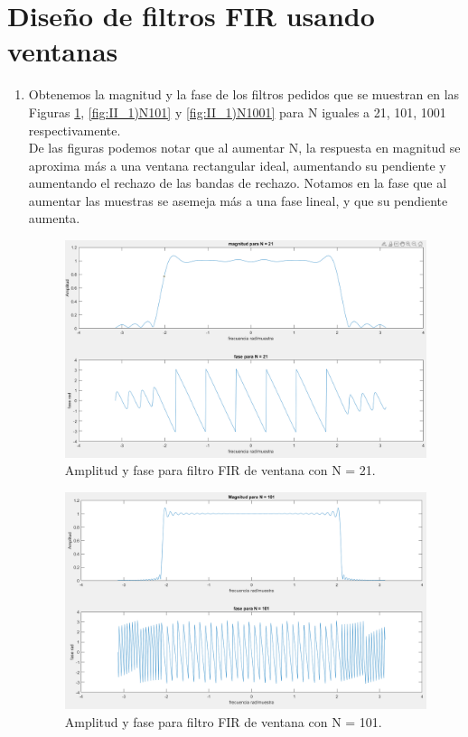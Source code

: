 \documentclass[letterpaper,onecolumn,10pt,journal,final]{IEEEtran}
\begin{document}
\section{Diseño de filtros FIR usando ventanas}
\begin{enumerate}[1)]
    \item %
    Obtenemos la magnitud y la fase de los filtros pedidos que se muestran en las Figuras \ref{fig:II_1)N21}, \ref{fig:II_1)N101} y \ref{fig:II_1)N1001} para N iguales a 21, 101, 1001 respectivamente.\\
    De las figuras podemos notar que al aumentar N, la respuesta en magnitud se aproxima más a una ventana rectangular ideal, aumentando su pendiente y aumentando el rechazo de las bandas de rechazo. Notamos en la fase que al aumentar las muestras se asemeja más a una fase lineal, y que su pendiente aumenta.
    \begin{figure}[H]
        \centering
        \includegraphics[width=0.75 \linewidth]{Figuras/II_1)N21.png}
        \caption{Amplitud y fase para filtro FIR de ventana con N = 21.}
        \label{fig:II_1)N21}
    \end{figure}
    \begin{figure}[H]
        \centering
        \includegraphics[width=0.75 \linewidth]{Figuras/II_1)N101.png}
        \caption{Amplitud y fase para filtro FIR de ventana con N = 101.}

\end{figure}
\end{enumerate}
\end{document}
